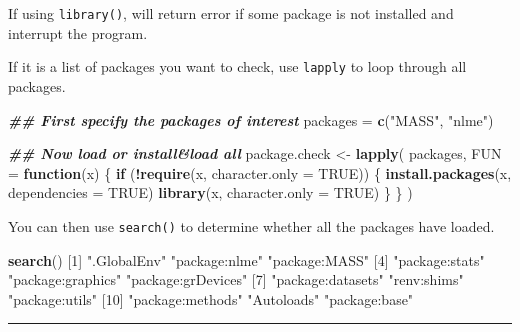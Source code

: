 \documentclass[
]{book}
\newenvironment{Shaded}{\begin{snugshade}}{\end{snugshade}}
\newcommand{\AttributeTok}[1]{\textcolor[rgb]{0.13,0.29,0.53}{#1}}
\newcommand{\ConstantTok}[1]{\textcolor[rgb]{0.56,0.35,0.01}{#1}}
\newcommand{\ControlFlowTok}[1]{\textcolor[rgb]{0.13,0.29,0.53}{\textbf{#1}}}
\newcommand{\DecValTok}[1]{\textcolor[rgb]{0.00,0.00,0.81}{#1}}
\newcommand{\DocumentationTok}[1]{\textcolor[rgb]{0.56,0.35,0.01}{\textbf{\textit{#1}}}}
\newcommand{\FunctionTok}[1]{\textcolor[rgb]{0.13,0.29,0.53}{\textbf{#1}}}
\newcommand{\NormalTok}[1]{#1}
\newcommand{\OtherTok}[1]{\textcolor[rgb]{0.56,0.35,0.01}{#1}}
\newcommand{\SpecialCharTok}[1]{\textcolor[rgb]{0.81,0.36,0.00}{\textbf{#1}}}
\newcommand{\StringTok}[1]{\textcolor[rgb]{0.31,0.60,0.02}{#1}}
\begin{document}
If using \texttt{library()}, will return error if some package is not installed and interrupt the program.

If it is a list of packages you want to check, use \texttt{lapply} to loop through all packages.

\begin{Shaded}
\begin{Highlighting}[]
\DocumentationTok{\#\# First specify the packages of interest}
\NormalTok{packages }\OtherTok{=} \FunctionTok{c}\NormalTok{(}\StringTok{"MASS"}\NormalTok{, }\StringTok{"nlme"}\NormalTok{)}

\DocumentationTok{\#\# Now load or install\&load all}
\NormalTok{package.check }\OtherTok{\textless{}{-}} \FunctionTok{lapply}\NormalTok{(}
\NormalTok{  packages,}
  \AttributeTok{FUN =} \ControlFlowTok{function}\NormalTok{(x) \{}
    \ControlFlowTok{if}\NormalTok{ (}\SpecialCharTok{!}\FunctionTok{require}\NormalTok{(x, }\AttributeTok{character.only =} \ConstantTok{TRUE}\NormalTok{)) \{}
      \FunctionTok{install.packages}\NormalTok{(x, }\AttributeTok{dependencies =} \ConstantTok{TRUE}\NormalTok{)}
      \FunctionTok{library}\NormalTok{(x, }\AttributeTok{character.only =} \ConstantTok{TRUE}\NormalTok{)}
\NormalTok{    \}}
\NormalTok{  \}}
\NormalTok{)}
\end{Highlighting}
\end{Shaded}

You can then use \texttt{search()} to determine whether all the packages have loaded.

\begin{Shaded}
\begin{Highlighting}[]
\FunctionTok{search}\NormalTok{()}
\NormalTok{ [}\DecValTok{1}\NormalTok{] }\StringTok{".GlobalEnv"}        \StringTok{"package:nlme"}      \StringTok{"package:MASS"}     
\NormalTok{ [}\DecValTok{4}\NormalTok{] }\StringTok{"package:stats"}     \StringTok{"package:graphics"}  \StringTok{"package:grDevices"}
\NormalTok{ [}\DecValTok{7}\NormalTok{] }\StringTok{"package:datasets"}  \StringTok{"renv:shims"}        \StringTok{"package:utils"}    
\NormalTok{[}\DecValTok{10}\NormalTok{] }\StringTok{"package:methods"}   \StringTok{"Autoloads"}         \StringTok{"package:base"}     
\end{Highlighting}
\end{Shaded}

\begin{center}\rule{0.5\linewidth}{0.5pt}\end{center}
\end{document}
